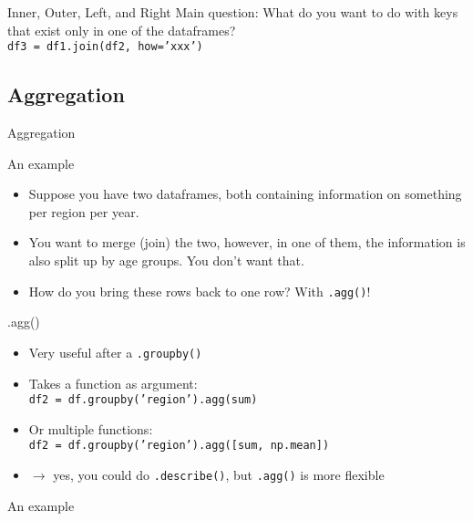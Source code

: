 \documentclass[compress]{beamer}
\begin{document}
\begin{frame}[fragile]{Inner, Outer, Left, and Right}
Main question: What do you want to do with keys that exist only in one of the  dataframes? \\
\pause
\vfill
\texttt{df3 = df1.join(df2, how='xxx')}\\
\vfill

\end{frame}



\subsection{Aggregation}
\begin{frame}[plain]
Aggregation
\end{frame}

\begin{frame}{An example}
\begin{itemize}
	\item Suppose you have two dataframes, both containing information on something  per region per year.
	\item 	You want to merge (join) the two, however, in one of them, the information is also split up by age groups. You don’t want that.
	\item 	How do you bring these rows back to one row? With \texttt{.agg()}!
\end{itemize}

\end{frame}


\begin{frame}{.agg()}
\begin{itemize}[<+->]
	\item Very useful after a \texttt{.groupby()}
	\item Takes a function as argument: \\	\texttt{df2 = df.groupby('region').agg(sum)}
	\item Or multiple functions: \\ \texttt{df2 = df.groupby('region').agg([sum, np.mean])}
	\item $\rightarrow$ yes, you could do \texttt{.describe()}, but \texttt{.agg()} is more flexible	
\end{itemize}
\end{frame}


\begin{frame}[plain]
An example
\end{frame}
\end{document}
